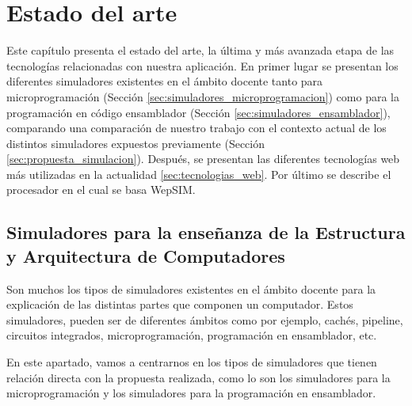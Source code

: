 \chead[]{}
\renewcommand{\headrulewidth}{0.5pt}

\lfoot[]{}
\cfoot[]{}
\rfoot[]{}
\renewcommand{\footrulewidth}{0pt}

\chapter{Estado del arte}
\label{ch:state_of_the_art}

Este capítulo presenta el estado del arte, la última y más avanzada etapa de las tecnologías relacionadas con nuestra aplicación. En primer lugar se presentan los diferentes simuladores existentes en el ámbito docente tanto para microprogramación (Sección \ref{sec:simuladores_microprogramacion}) como para la programación en código ensamblador (Sección \ref{sec:simuladores_ensamblador}), comparando una comparación de nuestro trabajo con el contexto actual de los distintos simuladores expuestos previamente (Sección \ref{sec:propuesta_simulacion}). Después, se presentan las diferentes tecnologías web más utilizadas en la actualidad \ref{sec:tecnologias_web}. Por último se describe el procesador en el cual se basa WepSIM.

\section{Simuladores para la enseñanza de la Estructura y Arquitectura de Computadores}

Son muchos los tipos de simuladores existentes en el ámbito docente para la explicación de las distintas partes que componen un computador. Estos simuladores, pueden ser de diferentes ámbitos como por ejemplo, cachés, pipeline, circuitos integrados, microprogramación, programación en ensamblador, etc.

En este apartado, vamos a centrarnos en los tipos de simuladores que tienen relación directa con la propuesta realizada, como lo son los simuladores para la microprogramación y los simuladores para la programación en ensamblador.

